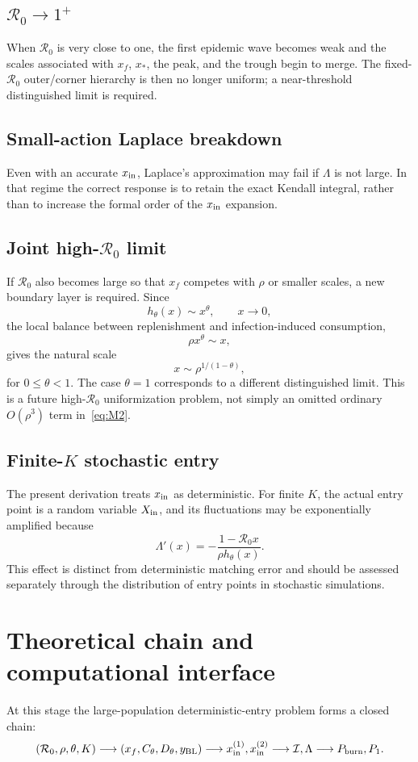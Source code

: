 \documentclass[11pt,a4paper]{article}
\newcommand{\Rzero}{\mathcal R_0}
\newcommand{\BL}{y_{\rm BL}}
\newcommand{\xf}{x_f}
\newcommand{\Pone}{P_1}
\newcommand{\Pburn}{P_{\rm burn}}
\begin{document}
\subsection{$\Rzero\to1^+$}
When $\Rzero$ is very close to one, the first epidemic wave becomes weak and the scales associated with $x_f$, $x_*$, the peak, and the trough begin to merge. The fixed-$\Rzero$ outer/corner hierarchy is then no longer uniform; a near-threshold distinguished limit is required.

\subsection{Small-action Laplace breakdown}
Even with an accurate $x_{\rm in}$, Laplace's approximation may fail if $\Lambda$ is not large. In that regime the correct response is to retain the exact Kendall integral, rather than to increase the formal order of the $x_{\rm in}$ expansion.

\subsection{Joint high-$\Rzero$ limit}
If $\Rzero$ also becomes large so that $x_f$ competes with $\rho$ or smaller scales, a new boundary layer is required. Since
\[
h_\theta(x)\sim x^\theta,
\qquad x\to0,
\]
the local balance between replenishment and infection-induced consumption,
\[
\rho x^\theta\sim x,
\]
gives the natural scale
\begin{equation}
\label{eq:highRscale}
x\sim\rho^{1/(1-\theta)},
\end{equation}
for $0\leq\theta<1$. The case $\theta=1$ corresponds to a different distinguished limit. This is a future high-$\Rzero$ uniformization problem, not simply an omitted ordinary $O(\rho^3)$ term in~\eqref{eq:M2}.

\subsection{Finite-$K$ stochastic entry}
The present derivation treats $x_{\rm in}$ as deterministic. For finite $K$, the actual entry point is a random variable $X_{\rm in}$, and its fluctuations may be exponentially amplified because
\[
\Lambda'(x)
=-\frac{1-\Rzero x}{\rho h_\theta(x)}.
\]
This effect is distinct from deterministic matching error and should be assessed separately through the distribution of entry points in stochastic simulations.

\section{Theoretical chain and computational interface}
At this stage the large-population deterministic-entry problem forms a closed chain:
\[
(\Rzero,\rho,\theta,K)
\longrightarrow
(\xf,C_\theta,D_\theta,\BL)
\longrightarrow
x_{\rm in}^{(1)},x_{\rm in}^{(2)}
\longrightarrow
\mathcal I,\Lambda
\longrightarrow
\Pburn,\Pone.
\]
\end{document}
